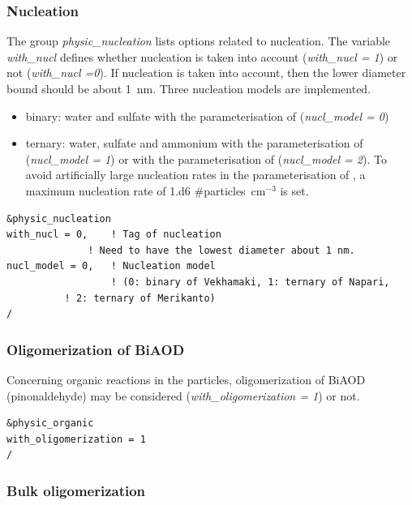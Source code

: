 \documentclass[a4paper,11pt]{article}
\begin{document}
\subsubsection{Nucleation}


The group {\textit{physic\_nucleation}} lists options related to nucleation. The variable {\textit{with\_nucl}} defines whether nucleation is taken into account ({\textit{with\_nucl = 1}}) or not ({\textit{with\_nucl =0}}). If nucleation is taken into account, then the lower diameter bound should be about 1~nm. Three nucleation models are implemented.
\begin{itemize}
\item binary: water and sulfate with the parameterisation of \cite{vehk} ({\textit{nucl\_model = 0}})
\item ternary: water, sulfate and ammonium with the parameterisation of \cite{napari} ({\textit{nucl\_model = 1}}) or with the parameterisation of \cite{merikantoa, merikantob} ({\textit{nucl\_model = 2}}).
To avoid artificially large nucleation rates in the parameterisation of \cite{napari}, a maximum nucleation rate of 1.d6 \#particles~cm$^{-3}$ is set.
\end{itemize}


\begin{verbatim}
&physic_nucleation
with_nucl = 0,    ! Tag of nucleation 
	    	  ! Need to have the lowest diameter about 1 nm.
nucl_model = 0,   ! Nucleation model 
                  ! (0: binary of Vekhamaki, 1: ternary of Napari, 
		  ! 2: ternary of Merikanto)
/
\end{verbatim} 

\subsubsection{Oligomerization of BiAOD}

Concerning organic reactions in the particles, oligomerization of BiAOD (pinonaldehyde) may be considered ({\textit{with\_oligomerization = 1}}) or not.


\begin{verbatim}
&physic_organic
with_oligomerization = 1      
/
\end{verbatim}

\subsubsection{Bulk oligomerization}
\end{document}
